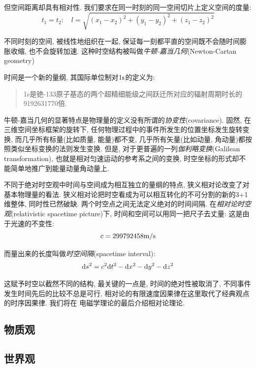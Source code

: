 但空间距离却具有相对性. 我们要求在同一时刻的同一空间切片上定义空间的度量:
\[t_1=t_2:\quad l=\sqrt{(x_1-x_2)^2+(y_1-y_2)^2+(z_1-z_2)^2}\]

不同时刻的空间, 被线性地组织在一起, 保证每一刻都平直的空间既不会随时间膨胀收缩, 也不会旋转加速. 这种时空结构被叫做\emph{牛顿-嘉当几何}(Newton-Cartan geometry)%

时间是一个新的量纲, 其国际单位制对$1{\rm s}$的定义为:
\begin{verse}
1s是铯-133原子基态的两个超精细能级之间跃迁所对应的辐射周期时长的9192631770倍.
\end{verse}

牛顿-嘉当几何的显著特点是物理量的定义没有所谓的\emph{协变性}(covariance). 固然, 在三维空间坐标框架的旋转下, 任何物理过程中的事件所发生的位置坐标发生旋转变换, 而几乎所有标量(比如质量, 能量)都不变, 几乎所有矢量(比如动量, 角动量)都按照类似坐标变换的法则发生变换. 但是, 对于更普遍的一列\emph{伽利略变换}(Galilean transformation), 也就是相对匀速运动的参考系之间的变换, 时空坐标的形式却不能简单地推广到能量动量角动量上.

不同于绝对时空观中时间与空间成为相互独立的量纲的特点, 狭义相对论改变了对基本物理量的看法. 狭义相对论把时空看成为可以相互转化的不可分割的新的3+1维整体, 同时性已然破缺. 两个时空点之间无法定义绝对的时间间隔. 在\emph{相对论时空观}(relativistic spacetime picture)下, 时间和空间可以用同一把尺子去丈量: 这是由于光速的不变性:
\[c=299792458{\rm m/s}\]

而量出来的长度叫做\emph{时空间隔}(spacetime interval):
\[\textrm{d} s^2=c^2\textrm{d} t^2-\textrm{d} x^2-\textrm{d} y^2-\textrm{d} z^2\]

这赋予时空以截然不同的结构, 最关键的一点是, 时间的绝对性被取消了, 不同事件发生时间先后的比较不总是可行, 相对论的有限速度因果律在这里取代了经典观点的时序因果律. 我们将在 电磁学理论的最后介绍相对论理论.

\subsection{物质观}\label{2-1-2}

\subsection{世界观}\label{2-1-3}